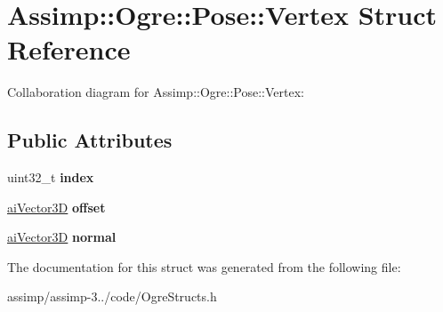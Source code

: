 \hypertarget{struct_assimp_1_1_ogre_1_1_pose_1_1_vertex}{\section{Assimp\+:\+:Ogre\+:\+:Pose\+:\+:Vertex Struct Reference}
\label{struct_assimp_1_1_ogre_1_1_pose_1_1_vertex}
}


Collaboration diagram for Assimp\+:\+:Ogre\+:\+:Pose\+:\+:Vertex\+:
\subsection*{Public Attributes}
\begin{DoxyCompactItemize}
\item 
\hypertarget{struct_assimp_1_1_ogre_1_1_pose_1_1_vertex_adc9b3299982886e8f676952e03fbc57d}{uint32\+\_\+t {\bfseries index}}\label{struct_assimp_1_1_ogre_1_1_pose_1_1_vertex_adc9b3299982886e8f676952e03fbc57d}

\item 
\hypertarget{struct_assimp_1_1_ogre_1_1_pose_1_1_vertex_ac8232fc288938e913cfb4f0a097645e7}{\hyperlink{structai_vector3_d}{ai\+Vector3\+D} {\bfseries offset}}\label{struct_assimp_1_1_ogre_1_1_pose_1_1_vertex_ac8232fc288938e913cfb4f0a097645e7}

\item 
\hypertarget{struct_assimp_1_1_ogre_1_1_pose_1_1_vertex_a6c2de7efdd5be26848cf5c5b64058026}{\hyperlink{structai_vector3_d}{ai\+Vector3\+D} {\bfseries normal}}\label{struct_assimp_1_1_ogre_1_1_pose_1_1_vertex_a6c2de7efdd5be26848cf5c5b64058026}

\end{DoxyCompactItemize}


The documentation for this struct was generated from the following file\+:\begin{DoxyCompactItemize}
\item 
assimp/assimp-\/3../code/Ogre\+Structs.\+h\end{DoxyCompactItemize}
